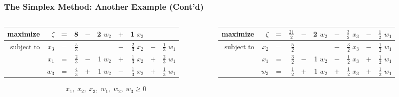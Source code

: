 \documentclass[usenames,dvipsnames,8pt]{beamer}%
\begin{document}
\begin{frame}
  \frametitle{The Simplex Method: Another Example (Cont'd)}
  \begin{columns}
    \begin{column}{0.5\textwidth}
      \begin{table}[ht]
        \centering
        \setlength\tabcolsep{2pt}
        \begin{tabular}{rrcrcrcrcr}
          \toprule
          maximize   &$\zeta$& = &  8 & $-$ & 2 $w_2$ &\cellcolor{C2}\color{white}  $+$ &\cellcolor{C2}\color{white}  1 $x_2$ &  &  \\
          \midrule
          subject to & $x_3$ & = & $\frac{5}{3}$ &     &           & $-$ & $\frac{2}{3}$ $x_2$ & $-$ & $\frac{1}{3}$ $w_1$ \\ 
                     & $x_1$ & = & $\frac{2}{3}$ & $-$ & 1   $w_2$ & $+$ & $\frac{1}{3}$ $x_2$ & $+$ & $\frac{2}{3}$ $w_1$ \\
                     & $w_3$ & = & $\frac{4}{3}$ & $+$ & 1 $w_2$ & $-$ & $\frac{1}{3}$ $x_2$ & $+$ & $\frac{1}{3}$ $w_1$ \\
          \bottomrule
        \end{tabular}
      \end{table}
      \vspace{-0.4cm}
      \begin{align*}
        x_1,\;x_2,\;x_3,\;w_1,\;w_2,\;w_3\geqslant 0
      \end{align*}
    \end{column}
    \begin{column}{0.5\textwidth}
      \begin{table}[ht]
        \centering
        \setlength\tabcolsep{2pt}
        \begin{tabular}{rrcrcrcrcr}
          \toprule
          maximize   &$\zeta$& = & $\frac{21}{2}$ & $-$ & 2 $w_2$ & $-$ & $\frac{3}{2}$ $x_3$ & $-$ & $\frac{1}{2}$ $w_1$ \\
          \midrule
          subject to & $x_2$ & = & $\frac{5}{2}$ &     &           & $-$ & $\frac{3}{2}$ $x_3$ & $-$ & $\frac{1}{2}$ $w_1$ \\ 
                     & $x_1$ & = & $\frac{3}{2}$ & $-$ & 1 $w_2$ & $-$ & $\frac{1}{2}$ $x_3$ & $+$ & $\frac{1}{2}$ $w_1$ \\
                     & $w_3$ & = & $\frac{1}{2}$ & $+$ & 1 $w_2$ & $+$ & $\frac{1}{2}$ $x_3$ & $+$ & $\frac{1}{2}$ $w_1$ \\
          \bottomrule
        \end{tabular}

\end{table}
\end{column}
\end{columns}
\end{frame}
\end{document}
